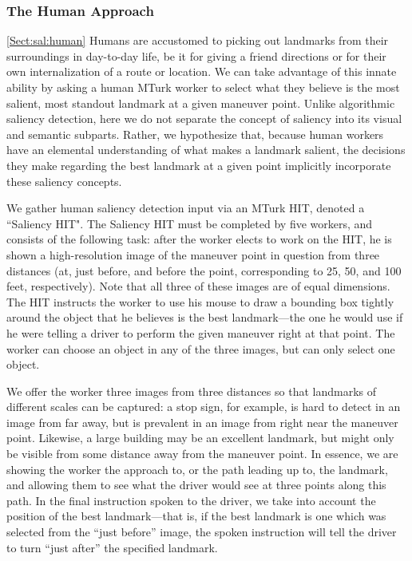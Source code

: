 \subsubsection{The Human Approach}\ref{Sect:sal:human}
Humans are accustomed to picking out landmarks from their surroundings in day-to-day life, be it for giving a friend directions or for their own internalization of a route or location. We can take advantage of this innate ability by asking a human MTurk worker to select what they believe is the most salient, most standout landmark at a given maneuver point. Unlike algorithmic saliency detection, here we do not separate the concept of saliency into its visual and semantic subparts. Rather, we hypothesize that, because human workers have an elemental understanding of what makes a landmark salient, the decisions they make regarding the best landmark at a given point implicitly incorporate these saliency concepts.

We gather human saliency detection input via an MTurk HIT, denoted a ``Saliency HIT". The Saliency HIT must be completed by five workers, and consists of the following task: after the worker elects to work on the HIT, he is shown a high-resolution image of the maneuver point in question from three distances (at, just before, and before the point, corresponding to 25, 50, and 100 feet, respectively). Note that all three of these images are of equal dimensions. The HIT instructs the worker to use his mouse to draw a bounding box tightly around the object that he believes is the best landmark---the one he would use if he were telling a driver to perform the given maneuver right at that point. The worker can choose an object in any of the three images, but can only select one object.

We offer the worker three images from three distances so that landmarks of different scales can be captured: a stop sign, for example, is hard to detect in an image from far away, but is prevalent in an image from right near the maneuver point. Likewise, a large building may be an excellent landmark, but might only be visible from some distance away from the maneuver point. In essence, we are showing the worker the approach to, or the path leading up to, the landmark, and allowing them to see what the driver would see at three points along this path. In the final instruction spoken to the driver, we take into account the position of the best landmark---that is, if the best landmark is one which was selected from the “just before” image, the spoken instruction will tell the driver to turn “just after” the specified landmark.

